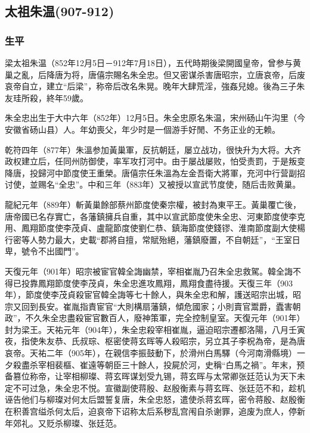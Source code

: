 
\subsection{太祖朱温\tiny(907-912)}

\subsubsection{生平}

梁太祖朱温（852年12月5日－912年7月18日），五代時期後梁開國皇帝，曾参与黄巢之亂，后降唐为将，唐僖宗賜名朱全忠。但又密谋杀害唐昭宗，立唐哀帝，后废哀帝自立，建立“后梁”，称帝后改名朱晃。晚年大肆荒淫，強姦兒媳。後為三子朱友珪所殺，終年59歲。

朱全忠出生于大中六年（852年）12月5日。朱全忠原名朱温，宋州砀山午沟里（今安徽省砀山县）人。年幼喪父，年少时是一個游手好閒、不务正业的无赖。

乾符四年（877年）朱溫参加黃巢軍，反抗朝廷，屡立战功，很快升为大将。大齐政权建立后，任同州防御使，率军攻打河中。由于屡战屡败，怕受责罰，于是叛变降唐，投歸河中節度使王重榮。唐僖宗任朱溫為左金吾衛大將軍，充河中行营副招讨使，並赐名“全忠”。中和三年（883年）又被授以宣武节度使，随后击败黄巢。

龍紀元年（889年）斬黃巢餘部蔡州節度使秦宗權，被封為東平王。黃巢覆亡後，唐帝國已名存實亡，各藩鎮擁兵自重，其中以宣武節度使朱全忠、河東節度使李克用、鳳翔節度使李茂貞、盧龍節度使劉仁恭、鎮海節度使錢镠、淮南節度副大使楊行密等人勢力最大，史載“郡將自擅，常賦殆絕，藩鎮廢置，不自朝廷”，“王室日卑，號令不出國門”。

天復元年（901年）昭宗被宦官韓全誨幽禁，宰相崔胤乃召朱全忠救駕。韓全誨不得已投靠鳳翔節度使李茂貞，朱全忠進攻鳳翔，鳳翔食盡待援。天復三年（903年），節度使李茂貞殺宦官韓全誨等七十餘人，與朱全忠和解，護送昭宗出城，昭宗又回到長安。崔胤指責宦官“大則構扇藩鎮，傾危國家；小則賣官鬻爵，蠹害朝政”，不久朱全忠盡殺宦官數百人，廢神策軍，完全控制皇室。天復元年（901年）封为梁王。天祐元年（904年），朱全忠殺宰相崔胤，逼迫昭宗遷都洛陽，八月壬寅夜，指使朱友恭、氏叔琮、枢密使蒋玄晖等人殺昭宗，另立其子李柷為帝，是為唐哀帝。天祐二年（905年），在親信李振鼓動下，於滑州白馬驛（今河南滑縣境）一夕殺盡杀宰相裴樞、崔遠等朝臣三十餘人，投屍於河，史稱“白馬之禍”。年末，预备篡位称帝，让宰相柳璨、蒋玄晖谋划受九锡，蒋玄晖与太常卿张廷范认为天下未定不可过急，朱全忠不悦。宣徽副使蒋殷、赵殷衡素与蒋玄晖、张廷范不和，趁机诬告他们与柳璨对何太后盟誓复唐，朱全忠怒，遣使杀蒋玄晖，密令蒋殷、赵殷衡在积善宫缢杀何太后，迫哀帝下诏称太后系秽乱宫闱自杀谢罪，追废为庶人，停新年郊礼。又贬杀柳璨、张廷范。

